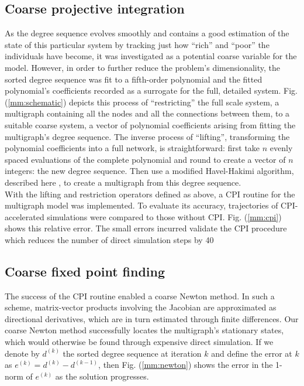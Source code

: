\documentclass[12pt]{article}
\begin{document}
\begin{spacing}{2.2}
\subsection*{Coarse projective integration}
As the degree sequence evolves smoothly and contains a good estimation of the state of this particular system by tracking just how ``rich'' and ``poor'' the individuals have become, it was investigated as a potential coarse variable for the model. However, in order to further reduce the problem's dimensionality, the sorted degree sequence was fit to a fifth-order polynomial and the fitted polynomial's coefficients recorded as a surrogate for the full, detailed system. Fig. (\ref{mm:schematic}) depicts this process of ``restricting'' the full scale system, a multigraph containing all the nodes and all the connections between them, to a suitable coarse system, a vector of polynomial coefficients arising from fitting the multigraph's degree sequence. The inverse process of ``lifting'', transforming the polynomial coefficients into a full network, is straightforward: first take $n$ evenly spaced evaluations of the complete polynomial and round to create a vector of $n$ integers: the new degree sequence. Then use a modified Havel-Hakimi algorithm, described here \cite{S.L.Hakimi1962}, to create a multigraph from this degree sequence. \\
With the lifting and restriction operators defined as above, a CPI routine for the multigraph model was implemented. To evaluate its accuracy, trajectories of CPI-accelerated simulations were compared to those without CPI. Fig. (\ref{mm:cpi}) shows this relative error. The small errors incurred validate the CPI procedure which reduces the number of direct simulation steps by 40%
\subsection*{Coarse fixed point finding}
The success of the CPI routine enabled a coarse Newton method. In such a scheme, matrix-vector products involving the Jacobian are approximated as directional derivatives, which are in turn estimated through finite differences. Our coarse Newton method successfully locates the multigraph's stationary states, which would otherwise be found through expensive direct simulation. If we denote by $d^{(k)}$ the sorted degree sequence at iteration $k$ and define the error at $k$ as $e^{(k)} = d^{(k)} - d^{(k-1)}$, then Fig. (\ref{mm:newton}) shows the error in the 1-norm of $e^{(k)}$ as the solution progresses.

\end{spacing}
\end{document}
